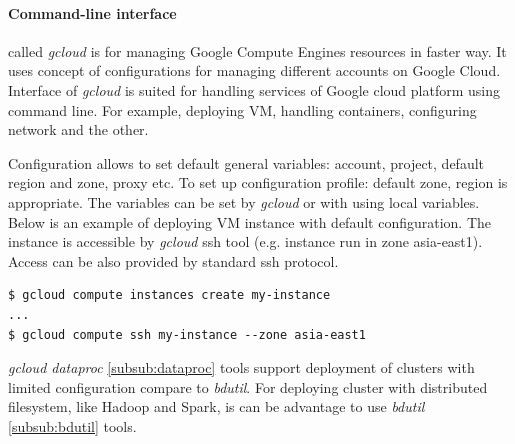 \documentclass[a4paper,12pt,oneside]{report}
\begin{document}
\begin{table}[!htbp]
		\caption{Overview of Google Cloud platform}
		\label{tab:google_all}
	\end{table}
	
	\paragraph{Command-line interface} called \textit{gcloud}  is for managing
	Google Compute Engines resources in faster way. It uses concept of
	configurations for managing different accounts on Google Cloud. 
	Interface of \textit{gcloud} is suited for handling services of Google cloud
	platform using command line. For example, 
	deploying VM, handling containers, configuring network and the other.
	
	Configuration allows to set default general variables: account, project, default
	region 
	and zone, proxy etc. To set up configuration profile: default zone, region is
	appropriate. 
	The variables can be set by \textit{gcloud} or with using 
	local variables.
	Below is an example of deploying VM instance with default configuration. The
	instance 
	is accessible by \textit{gcloud} ssh tool (e.g. instance run in zone asia-east1).
	Access can be also provided 
	by standard ssh protocol.
        \newpage
	\begin{footnotesize}
		\begin{lstlisting}[style=mybash]
$ gcloud compute instances create my-instance
...
$ gcloud compute ssh my-instance --zone asia-east1
		\end{lstlisting}
	\end{footnotesize}
	\textit{gcloud dataproc} \ref{subsub:dataproc} tools support deployment of
	clusters with limited configuration compare to \textit{bdutil}. For deploying 
	cluster with distributed filesystem, like Hadoop and Spark, is can be advantage
	to use \textit{bdutil} \ref{subsub:bdutil} tools. 
	
\end{document}
